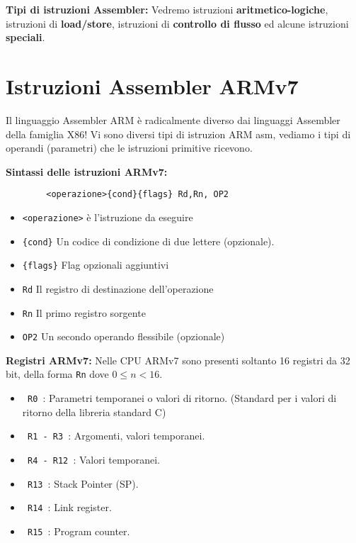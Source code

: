 \begin{defn}
	\textbf{Tipi di istruzioni Assembler:}
	Vedremo istruzioni \textbf{aritmetico-logiche}, istruzioni di \textbf{load/store}, istruzioni di \textbf{controllo di flusso} ed alcune istruzioni \textbf{speciali}.
\end{defn}

\section{Istruzioni Assembler ARMv7}

\begin{note}
	Il linguaggio Assembler ARM è radicalmente diverso dai linguaggi Assembler della famiglia X86! Vi sono diversi tipi di istruzion ARM asm, vediamo i tipi di operandi (parametri) che le istruzioni primitive ricevono.
\end{note}

\begin{defn}
	\textbf{Sintassi delle istruzioni ARMv7:}
	
	\begin{Verbatim}
		<operazione>{cond}{flags} Rd,Rn, OP2
	\end{Verbatim}
	
	\begin{itemize}
		\item \verb|<operazione>| è l'istruzione da eseguire
		\item \verb|{cond}| Un codice di condizione di due lettere (opzionale).
		\item \verb|{flags}| Flag opzionali aggiuntivi
		\item \verb|Rd| Il registro di destinazione dell'operazione
		\item \verb|Rn| Il primo registro sorgente 
		\item \verb|OP2| Un secondo operando flessibile (opzionale)
	\end{itemize}
	
\end{defn}

\begin{defn}
	\textbf{Registri ARMv7:}
	Nelle CPU ARMv7 sono presenti soltanto 16 registri da 32 bit, della forma \verb|Rn| dove $ 
	0 \leq n < 16 $. 
	
	\begin{itemize}
		\item \verb| R0 |: Parametri temporanei o valori di ritorno. (Standard per i valori di ritorno della libreria standard C)
		\item \verb| R1 - R3 |: Argomenti, valori temporanei.
		\item \verb| R4 - R12 |: Valori temporanei.
		\item \verb| R13 |: Stack Pointer (SP).		
		\item \verb| R14 |: Link register.
		\item \verb| R15 |: Program counter.
	\end{itemize}
\end{defn}


